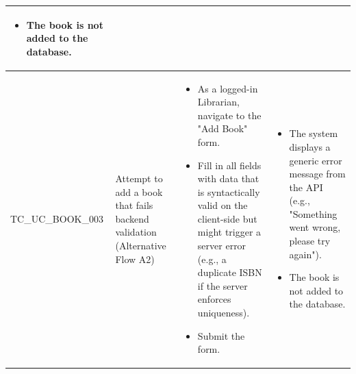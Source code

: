 \begin{longtable}{|>{\scriptsize\raggedright\arraybackslash}p{3.5cm}|>{\raggedright\arraybackslash}p{3.5cm}|>{\raggedright\arraybackslash}p{4cm}|>{\raggedright\arraybackslash}p{4cm}|}
\begin{itemize}[noitemsep, topsep=0pt, partopsep=0pt, leftmargin=*]
        \item The book is not added to the database.
    \end{itemize} \\ \hline
TC\_UC\_BOOK\_003 & Attempt to add a book that fails backend validation (Alternative Flow A2) & 
    \begin{itemize}[noitemsep, topsep=0pt, partopsep=0pt, leftmargin=*]
        \item As a logged-in Librarian, navigate to the "Add Book" form.
        \item Fill in all fields with data that is syntactically valid on the client-side but might trigger a server error (e.g., a duplicate ISBN if the server enforces uniqueness).
        \item Submit the form.
    \end{itemize} & 
    \begin{itemize}[noitemsep, topsep=0pt, partopsep=0pt, leftmargin=*]
        \item The system displays a generic error message from the API (e.g., "Something went wrong, please try again").
        \item The book is not added to the database.
    \end{itemize} \\ \hline


\end{longtable}
